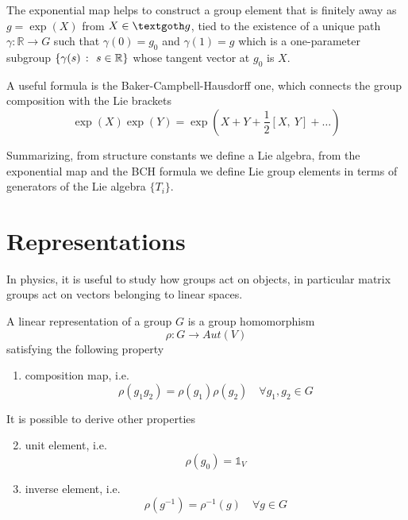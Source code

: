     The exponential map helps to construct a group element that is finitely away as $g = \exp(X)$ from $X \in \textgoth g$, tied to the existence of a unique path $\gamma \colon \mathbb R \rightarrow G$ such that $\gamma(0) = g_0$ and $\gamma(1) = g$ which is a one-parameter subgroup $\{\gamma(s)~\colon~s \in \mathbb R\}$ whose tangent vector at $g_0$ is $X$.  

    A useful formula is the Baker-Campbell-Hausdorff one, which connects the group composition with the Lie brackets
    \begin{equation*}
        \exp(X)\exp(Y) = \exp(X + Y + \frac{1}{2} [X, ~Y] + \ldots)
    \end{equation*}

    Summarizing, from structure constants we define a Lie algebra, from the exponential map and the BCH formula we define Lie group elements in terms of generators of the Lie algebra $\{T_i\}$.

\chapter{Representations}

    In physics, it is useful to study how groups act on objects, in particular matrix groups act on vectors belonging to linear spaces.

    \begin{definition}[Representation]
        A linear representation of a group $G$ is a group homomorphism 
        \begin{equation*}
            \rho \colon G \rightarrow Aut(V) 
        \end{equation*}
        satisfying the following property
        \begin{enumerate}
            \item composition map, i.e.
            \begin{equation*}
                \rho(g_1 g_2) = \rho(g_1) \rho(g_2) \quad \forall g_1, g_2 \in G
            \end{equation*}
        \end{enumerate}
    \end{definition}

    It is possible to derive other properties
    \begin{enumerate}
    \setcounter{enumi}{1}
        \item unit element, i.e.
        \begin{equation*}
            \rho(g_0) = \mathds 1_V
        \end{equation*}
        \item inverse element, i.e.
        \begin{equation*}
            \rho(g^{-1}) = \rho^{-1}(g) \quad \forall g \in G
        \end{equation*}
    \end{enumerate}

